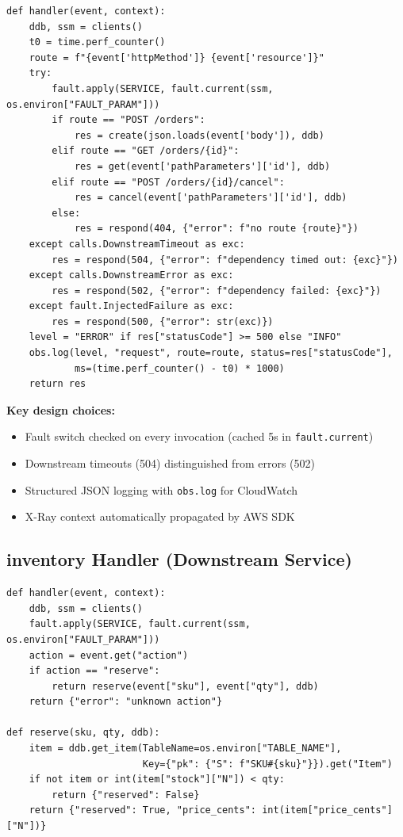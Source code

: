 \begin{verbatim}
def handler(event, context):
    ddb, ssm = clients()
    t0 = time.perf_counter()
    route = f"{event['httpMethod']} {event['resource']}"
    try:
        fault.apply(SERVICE, fault.current(ssm, os.environ["FAULT_PARAM"]))
        if route == "POST /orders":
            res = create(json.loads(event['body']), ddb)
        elif route == "GET /orders/{id}":
            res = get(event['pathParameters']['id'], ddb)
        elif route == "POST /orders/{id}/cancel":
            res = cancel(event['pathParameters']['id'], ddb)
        else:
            res = respond(404, {"error": f"no route {route}"})
    except calls.DownstreamTimeout as exc:
        res = respond(504, {"error": f"dependency timed out: {exc}"})
    except calls.DownstreamError as exc:
        res = respond(502, {"error": f"dependency failed: {exc}"})
    except fault.InjectedFailure as exc:
        res = respond(500, {"error": str(exc)})
    level = "ERROR" if res["statusCode"] >= 500 else "INFO"
    obs.log(level, "request", route=route, status=res["statusCode"],
            ms=(time.perf_counter() - t0) * 1000)
    return res
\end{verbatim}

\textbf{Key design choices:}
\begin{itemize}
    \item Fault switch checked on every invocation (cached 5s in \texttt{fault.current})
    \item Downstream timeouts (504) distinguished from errors (502)
    \item Structured JSON logging with \texttt{obs.log} for CloudWatch
    \item X-Ray context automatically propagated by AWS SDK
\end{itemize}

\subsection{inventory Handler (Downstream Service)}

\begin{verbatim}
def handler(event, context):
    ddb, ssm = clients()
    fault.apply(SERVICE, fault.current(ssm, os.environ["FAULT_PARAM"]))
    action = event.get("action")
    if action == "reserve":
        return reserve(event["sku"], event["qty"], ddb)
    return {"error": "unknown action"}

def reserve(sku, qty, ddb):
    item = ddb.get_item(TableName=os.environ["TABLE_NAME"],
                        Key={"pk": {"S": f"SKU#{sku}"}}).get("Item")
    if not item or int(item["stock"]["N"]) < qty:
        return {"reserved": False}
    return {"reserved": True, "price_cents": int(item["price_cents"]["N"])}
\end{verbatim}

